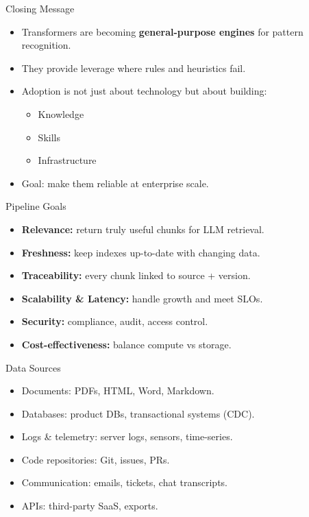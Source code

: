\documentclass{beamer}
\begin{document}
\begin{frame}{Closing Message}
\begin{itemize}
    \item Transformers are becoming \textbf{general-purpose engines} for pattern recognition.
    \item They provide leverage where rules and heuristics fail.
    \item Adoption is not just about technology but about building:
    \begin{itemize}
        \item Knowledge
        \item Skills
        \item Infrastructure
    \end{itemize}
    \item Goal: make them reliable at enterprise scale.
\end{itemize}
\end{frame}


\begin{frame}{Pipeline Goals}
\begin{itemize}
    \item \textbf{Relevance:} return truly useful chunks for LLM retrieval.
    \item \textbf{Freshness:} keep indexes up-to-date with changing data.
    \item \textbf{Traceability:} every chunk linked to source + version.
    \item \textbf{Scalability \& Latency:} handle growth and meet SLOs.
    \item \textbf{Security:} compliance, audit, access control.
    \item \textbf{Cost-effectiveness:} balance compute vs storage.
\end{itemize}
\end{frame}


\begin{frame}{Data Sources}
\begin{itemize}
    \item Documents: PDFs, HTML, Word, Markdown.
    \item Databases: product DBs, transactional systems (CDC).
    \item Logs \& telemetry: server logs, sensors, time-series.
    \item Code repositories: Git, issues, PRs.
    \item Communication: emails, tickets, chat transcripts.
    \item APIs: third-party SaaS, exports.
\end{itemize}
\end{frame}
\end{document}
